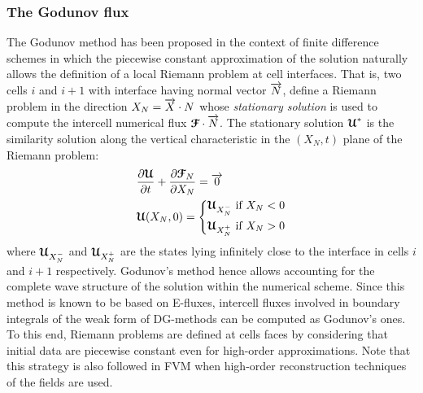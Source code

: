 \subsubsection*{The Godunov flux}
The Godunov method \cite{Godunov_method} has been proposed in the context of finite difference schemes in which the piecewise constant approximation of the solution naturally allows the definition of a local Riemann problem at cell interfaces.
That is, two cells $i$ and $i+1$ with interface having normal vector ${\overrightarrow{N}}$, define a Riemann problem in the direction $X_N={\overrightarrow{X}}\cdot{N}$ whose \textit{stationary solution} is used to compute the intercell numerical flux ${\boldsymbol{\mathcal{F}}} \cdot {\overrightarrow{N}}$. The stationary solution ${\boldsymbol{\mathcal{U}}}^*$ is the similarity solution along the vertical characteristic in the $(X_N,t)$ plane of the Riemann problem:
\begin{equation}
  \label{eq:RP_mesh}
  \begin{aligned}
    &\frac{\partial {\boldsymbol{\mathcal{U}}}}{\partial t} + \frac{\partial {\boldsymbol{\mathcal{F}}}_N}{\partial X_N} = {\overrightarrow{0}}  \\
    & {\boldsymbol{\mathcal{U}}}(X_N,0)= \left\lbrace 
      \begin{aligned}
        & {\boldsymbol{\mathcal{U}}}_{X_N^-} \text{ if } X_N <0 \\
        & {\boldsymbol{\mathcal{U}}}_{X_N^{+}} \text{ if } X_N > 0
      \end{aligned}
        \right.
  \end{aligned}
\end{equation}
where ${\boldsymbol{\mathcal{U}}}_{X_N^-}$ and ${\boldsymbol{\mathcal{U}}}_{X_N^{+}}$ are the states lying infinitely close to the interface in cells $i$ and $i+1$ respectively. 
Godunov's method hence allows accounting for the complete wave structure of the solution within the numerical scheme.
Since this method is known to be based on E-fluxes, intercell fluxes involved in boundary integrals of the weak form of DG-methods can be computed as Godunov's ones.
To this end, Riemann problems are defined at cells faces by considering that initial data are piecewise constant even for high-order approximations. Note that this strategy is also followed in FVM when high-order reconstruction techniques of the fields are used.

